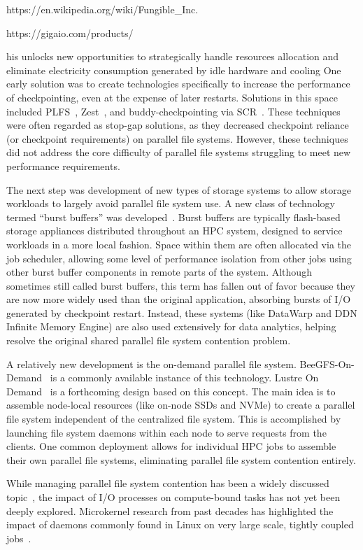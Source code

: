 https://en.wikipedia.org/wiki/Fungible_Inc.

https://gigaio.com/products/





his unlocks new opportunities to strategically handle resources allocation and eliminate electricity consumption generated by idle hardware and cooling
One early solution was to create technologies specifically to increase the performance of checkpointing, even at the expense of later restarts. Solutions in this space included PLFS~\cite{plfs}, Zest~\cite{zest}, and buddy-checkpointing via SCR~\cite{scr}. These techniques were often regarded as stop-gap solutions, as they decreased checkpoint reliance (or checkpoint requirements) on parallel file systems. However, these techniques did not address the core difficulty of parallel file systems struggling to meet new performance requirements.

The next step was development of new types of storage systems to allow storage workloads to largely avoid parallel file system use. A new class of technology termed ``burst buffers'' was developed~\cite{burstbuffers}. Burst buffers are typically flash-based storage appliances distributed throughout an HPC system, designed to service workloads in a more local fashion. Space within them are often allocated via the job scheduler, allowing some level of performance isolation from other jobs using other burst buffer components in remote parts of the system. Although sometimes still called burst buffers, this term has fallen out of favor because they are now more widely used than the original application, absorbing bursts of I/O generated by checkpoint restart. Instead, these systems (like DataWarp and DDN Infinite Memory Engine) are also used extensively for data analytics, helping resolve the original shared parallel file system contention problem.

A relatively new development is the on-demand parallel file system. BeeGFS-On-Demand~\cite{beeond} is a commonly available instance of this technology. Lustre On Demand~\cite{lustre-on-demand} is a forthcoming design based on this concept. The main idea is to assemble node-local resources (like on-node SSDs and NVMe) to create a parallel file system independent of the centralized file system. This is accomplished by launching file system daemons within each node to serve requests from the clients. One common deployment allows for individual HPC jobs to assemble their own parallel file systems, eliminating parallel file system contention entirely.

While managing parallel file system contention has been a widely discussed topic~\cite{managing-contention}, the impact of I/O processes on compute-bound tasks has not yet been deeply explored. Microkernel research from past decades has highlighted the impact of daemons commonly found in Linux on very large scale, tightly coupled jobs~\cite{daemon-interference}. 
